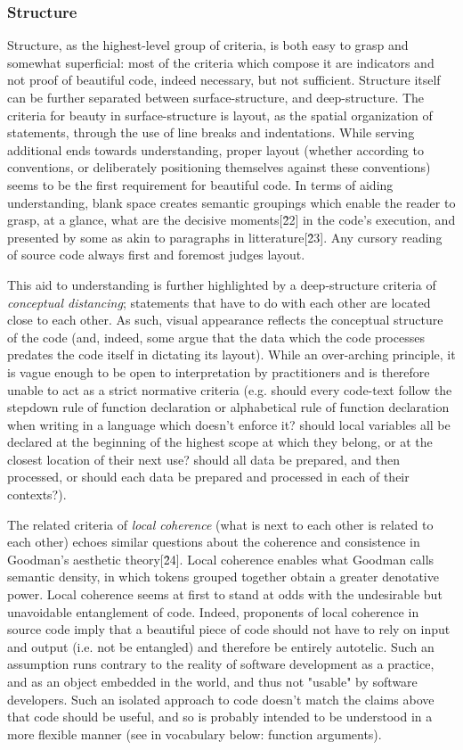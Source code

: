 \subsubsection{Structure}
\label{subsubsec:framework-structure}

Structure, as the highest-level group of criteria, is both easy to grasp and somewhat superficial: most of the criteria which compose it are indicators and not proof of beautiful code, indeed necessary,  but not sufficient. Structure itself can be further separated between surface-structure, and deep-structure. The criteria for beauty in surface-structure is layout, as the spatial organization of statements, through the use of line breaks and indentations. While serving additional ends towards understanding, proper layout (whether according to conventions, or deliberately positioning themselves against these conventions) seems to be the first requirement for beautiful code. In terms of aiding understanding, blank space creates semantic groupings which enable the reader to grasp, at a glance, what are the decisive moments[\^22] in the code's execution, and presented by some as akin to paragraphs in litterature[\^23]. Any cursory reading of source code always first and foremost judges layout.

This aid to understanding is further highlighted by a deep-structure criteria of \emph{conceptual distancing}; statements that have to do with each other are located close to each other. As such, visual appearance reflects the conceptual structure of the code (and, indeed, some argue that the data which the code processes predates the code itself in dictating its layout). While an over-arching principle, it is vague enough to be open to interpretation by practitioners and is therefore unable to act as a strict normative criteria (e.g. should every code-text follow the stepdown rule of function declaration or alphabetical rule of function declaration when writing in a language which doesn't enforce it? should local variables all be declared at the beginning of the highest scope at which they belong, or at the closest location of their next use? should all data be prepared, and then processed, or should each data be prepared and processed in each of their contexts?).

The related criteria of \emph{local coherence} (what is next to each other is related to each other) echoes similar questions about the coherence and consistence in Goodman's aesthetic theory[\^24]. Local coherence enables what Goodman calls semantic density, in which tokens grouped together obtain a greater denotative power. Local coherence seems at first to stand at odds with the undesirable but unavoidable entanglement of code. Indeed, proponents of local coherence in source code imply that a beautiful piece of code should not have to rely on input and output (i.e. not be entangled) and therefore be entirely autotelic. Such an assumption runs contrary to the reality of software development as a practice, and as an object embedded in the world, and thus not "usable" by software developers. Such an isolated approach to code doesn't match the claims above that code should be useful, and so is probably intended to be understood in a more flexible manner (see in vocabulary below: function arguments).


